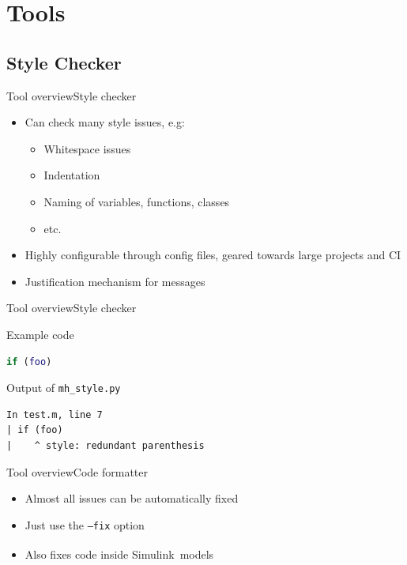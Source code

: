 \documentclass{beamer}
\newcommand{\simulink}[0]{Simulink\textsuperscript{\tiny\textregistered}}
\begin{document}
\section{Tools}
\subsection{Style Checker}
\begin{frame}{Tool overview}{Style checker}
  \begin{itemize}
  \item Can check many style issues, e.g:
    \begin{itemize}
    \item Whitespace issues
    \item Indentation
    \item Naming of variables, functions, classes
    \item etc.
    \end{itemize}
  \item Highly configurable through config files, geared towards large
    projects and CI
  \item Justification mechanism for messages
  \end{itemize}
\end{frame}

\begin{frame}[fragile]{Tool overview}{Style checker}
  \begin{block}{Example code}
\begin{lstlisting}[language=MATLAB]
if (foo)
\end{lstlisting}
  \end{block}
  \pause
  \begin{block}{Output of {\tt mh\_style.py}}
    \scriptsize
\begin{verbatim}
In test.m, line 7
| if (foo)
|    ^ style: redundant parenthesis
\end{verbatim}
  \end{block}
\end{frame}

\begin{frame}{Tool overview}{Code formatter}
  \begin{itemize}
  \item Almost all issues can be automatically fixed
  \item Just use the {\tt --fix} option
  \item Also fixes code inside \simulink~models
  \end{itemize}
\end{frame}
\end{document}

